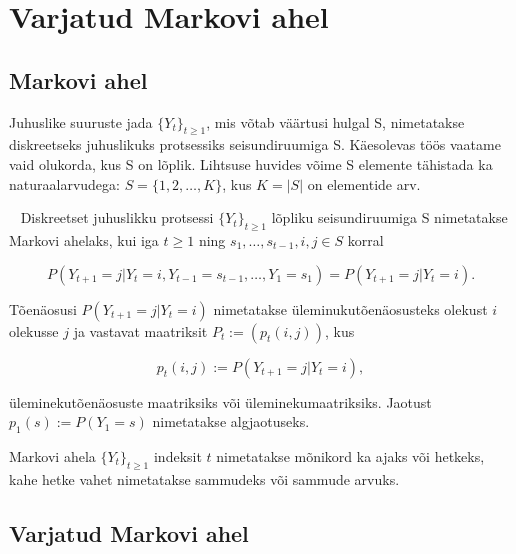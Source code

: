 
\section{Varjatud Markovi ahel} 

\subsection{Markovi ahel}

Juhuslike suuruste jada $\{Y_t\}_{t\geq1}$, mis võtab väärtusi hulgal S, nimetatakse diskreetseks juhuslikuks protsessiks seisundiruumiga S. Käesolevas töös vaa\-ta\-me vaid olukorda, kus S on lõplik. Lihtsuse huvides võime S elemente tähistada ka naturaalarvudega: $S = \{1,2,\dots,K\}$, kus $K = |S|$ on elementide arv.~\citep{raag,bremaud}

\begin{definition}~\citep{raag,bremaud}
Diskreetset juhuslikku protsessi $\{Y_t\}_{t\geq1}$ lõpliku seisundiruumiga S nimetatakse Markovi ahelaks, kui iga $t\geq1$ ning $s_1,\dots,s_{t-1},i,j \in S$ korral

\begin{equation*} \label{eq:markovchain}
P(Y_{t+1}=j | Y_{t}=i, Y_{t-1}=s_{t-1}, \dots, Y_{1}=s_{1}) = P(Y_{t+1}=j | Y_{t}=i).
\end{equation*}

\end{definition}

Tõenäosusi $P(Y_{t+1}=j | Y_{t}=i)$ nimetatakse üleminukutõenäosusteks ole\-kust $i$ olekusse $j$ ja vastavat maatriksit $P_t := (p_t(i,j))$, kus

\begin{equation*}
p_t(i,j) := P(Y_{t+1}=j | Y_{t}=i),
\end{equation*}

üleminekutõenäosuste maatriksiks või üleminekumaatriksiks. Jaotust \\ $p_1(s) := P(Y_1=s)$ nimetatakse algjaotuseks.

Markovi ahela $\{Y_t\}_{t\geq1}$ indeksit $t$ nimetatakse mõnikord ka ajaks või hetkeks, kahe hetke vahet nimetatakse sammudeks või sammude arvuks.~\citep{raag}

\subsection{Varjatud Markovi ahel}


